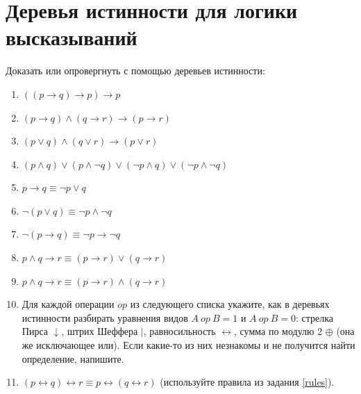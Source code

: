 \documentclass{article}
\begin{document}
\section{Деревья истинности для логики высказываний}
Доказать или опровергнуть с помощью деревьев истинности:
\begin{enumerate}
    \item $((p \to q) \to p) \to p$
    \item $(p \to q) \land (q \to r) \to (p \to r)$
    \item $(p \lor q) \land (q \lor r) \to (p \lor r)$
    \item $(p \land q) \lor (p \land \neg q) \lor (\neg p \land q) \lor (\neg p \land \neg q)$
    \item $p \to q \equiv \neg p \lor q$
    \item $\neg (p \lor q) \equiv \neg p \land \neg q$
    \item $\neg (p \to q) \equiv \neg p \to \neg q$
    \item $p \land q \to r \equiv (p \to r) \lor (q \to r)$
    \item $p \land q \to r \equiv (p \to r) \land (q \to r)$
    \item \label{rules} Для каждой операции $\mathit{op}$ из следующего списка укажите, как в деревьях истинности разбирать уравнения видов $A~\mathit{op}~B = 1$ и $A~\mathit{op}~B = 0$: стрелка Пирса $\downarrow$, штрих Шеффера $\mid$, равносильность $\leftrightarrow$, сумма по модулю 2 $\oplus$ (она же исключающее или). Если какие-то из них незнакомы и не получится найти определение, напишите.
    \item $(p \leftrightarrow q) \leftrightarrow r \equiv p \leftrightarrow (q \leftrightarrow r)$ (используйте правила из задания \ref*{rules}).
\end{enumerate}
\end{document}
